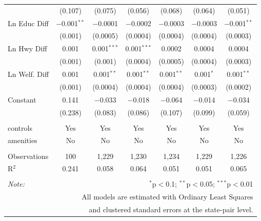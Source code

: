 \begin{table}[!htbp]
\begin{tabular}{@{\extracolsep{5pt}}lcccccc}
  & (0.107) & (0.075) & (0.056) & (0.068) & (0.064) & (0.051) \\ 
  Ln Educ Diff & $-$0.001$^{**}$ & $-$0.0001 & $-$0.0002 & $-$0.0003 & $-$0.0003 & $-$0.001$^{**}$ \\ 
  & (0.001) & (0.0005) & (0.0004) & (0.0004) & (0.0004) & (0.0003) \\ 
  Ln Hwy Diff & 0.001 & 0.001$^{***}$ & 0.001$^{***}$ & 0.0002 & 0.0004 & 0.0004 \\ 
  & (0.001) & (0.001) & (0.0004) & (0.0005) & (0.0004) & (0.0003) \\ 
  Ln Welf. Diff & 0.001 & 0.001$^{**}$ & 0.001$^{**}$ & 0.001$^{**}$ & 0.001$^{*}$ & 0.001$^{**}$ \\ 
  & (0.001) & (0.0004) & (0.0004) & (0.0004) & (0.0003) & (0.0002) \\ 
  Constant & 0.141 & $-$0.033 & $-$0.018 & $-$0.064 & $-$0.014 & $-$0.034 \\ 
  & (0.238) & (0.083) & (0.086) & (0.107) & (0.099) & (0.059) \\ 
 \hline \\[-1.8ex] 
controls & Yes & Yes & Yes & Yes & Yes & Yes \\ 
amenities & No & No & No & No & No & No \\ 
\hline \\[-1.8ex] 
Observations & 100 & 1,229 & 1,230 & 1,234 & 1,229 & 1,226 \\ 
R$^{2}$ & 0.241 & 0.058 & 0.064 & 0.051 & 0.051 & 0.065 \\ 
\hline 
\hline \\[-1.8ex] 
\textit{Note:}  & \multicolumn{6}{r}{$^{*}$p$<$0.1; $^{**}$p$<$0.05; $^{***}$p$<$0.01} \\ 
 & \multicolumn{6}{r}{All models are estimated with Ordinary Least Squares} \\ 
 & \multicolumn{6}{r}{and clustered standard errors at the state-pair level.} \\ 
\end{tabular} 
\end{table} 
